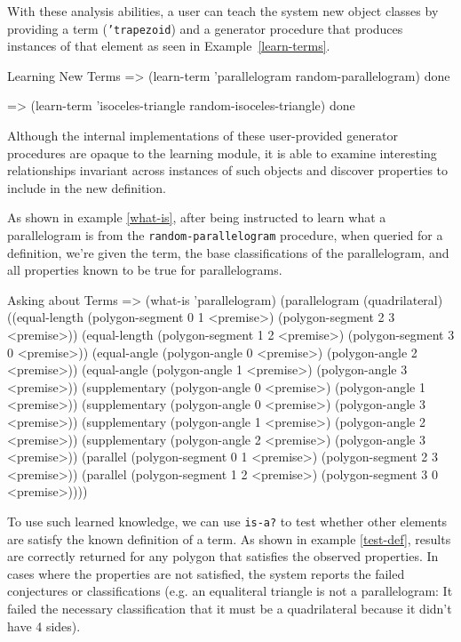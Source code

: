 With these analysis abilities, a user can teach the system new object
classes by providing a term (\texttt{'trapezoid}) and a generator
procedure that produces instances of that element as seen in
Example~\ref{learn-terms}.

\begin{repl-example}
[label=learn-terms]
{Learning New Terms}
=> (learn-term 'parallelogram random-parallelogram)
done

=> (learn-term 'isoceles-triangle random-isoceles-triangle)
done
\end{repl-example}

Although the internal implementations of these user-provided generator
procedures are opaque to the learning module, it is able to examine
interesting relationships invariant across instances of such objects
and discover properties to include in the new definition.

As shown in example \ref{what-is}, after being instructed to learn
what a parallelogram is from the \texttt{random-parallelogram}
procedure, when queried for a definition, we're given the term, the
base classifications of the parallelogram, and all properties known to
be true for parallelograms.

\begin{repl-example}
[label=what-is]
{Asking about Terms}
=> (what-is 'parallelogram)
(parallelogram
 (quadrilateral)
 ((equal-length (polygon-segment 0 1 <premise>)
                (polygon-segment 2 3 <premise>))
  (equal-length (polygon-segment 1 2 <premise>)
                (polygon-segment 3 0 <premise>))
  (equal-angle (polygon-angle 0 <premise>)
               (polygon-angle 2 <premise>))
  (equal-angle (polygon-angle 1 <premise>)
               (polygon-angle 3 <premise>))
  (supplementary (polygon-angle 0 <premise>)
                 (polygon-angle 1 <premise>))
  (supplementary (polygon-angle 0 <premise>)
                 (polygon-angle 3 <premise>))
  (supplementary (polygon-angle 1 <premise>)
                 (polygon-angle 2 <premise>))
  (supplementary (polygon-angle 2 <premise>)
                 (polygon-angle 3 <premise>))
  (parallel (polygon-segment 0 1 <premise>)
            (polygon-segment 2 3 <premise>))
  (parallel (polygon-segment 1 2 <premise>)
            (polygon-segment 3 0 <premise>))))
\end{repl-example}


To use such learned knowledge, we can use \texttt{is-a?} to test
whether other elements are satisfy the known definition of a term. As
shown in example \ref{test-def}, results are correctly returned for
any polygon that satisfies the observed properties. In cases where the
properties are not satisfied, the system reports the failed
conjectures or classifications (e.g. an equaliteral triangle is not a
parallelogram: It failed the necessary classification that it must be
a quadrilateral because it didn't have 4 sides).

